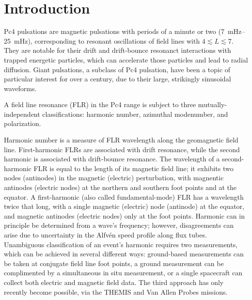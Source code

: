 \documentclass{article}
\newcommand{\Alfven}{Alfv\'en\xspace}
\begin{document}

\section{Introduction}

Pc4 pulsations are magnetic pulsations with periods of a minute or two (\SIrange{7}{25}{\mHz}), corresponding to resonant oscillations of field lines with $4 \lesssim L \lesssim 7$. They are notable for their drift and drift-bounce resonanct interactions with trapped energetic particles\cite{southwood_1976}, which can accelerate those particles\cite{elkington_1999} and lead to radial diffusion\cite{elkington_2003}. Giant pulsations, a subclass of Pc4 pulsation, have been a topic of particular interest for over a century, due to their large, strikingly sinusoidal waveforms\cite{brekke_1987}.

A field line resonance (FLR) in the Pc4 range is subject to three mutually-independent classifications: harmonic number, azimuthal modenumber, and polarization.

Harmonic number is a measure of FLR wavelength along the geomagnetic field line. First-harmonic FLRs are associated with drift resonance, while the second harmonic is associated with drift-bounce resonance\cite{dai_2013,poulter_1983}. The wavelength of a second-harmonic FLR is equal to the length of its magnetic field line; it exhibits two nodes (antinodes) in the magnetic (electric) perturbation, with magnentic antinodes (electric nodes) at the northern and southern foot points and at the equator. A first-harmonic (also called fundamental-mode) FLR has a wavelength twice that long, with a single magnetic (electric) node (antinode) at the equator, and magnetic antinodes (electric nodes) only at the foot points. Harmonic can in principle be determined from a wave's frequency; however, disagreements can arise due to uncertainty in the \Alfven speed profile along flux tubes\cite{takahashi_2013}. Unambiguous classification of an event's harmonic requires two measurements, which can be achieved in several different ways: ground-based measurements can be taken at conjugate field line foot points, a ground measurement can be complimented by a simultaneous in situ measurement, or a single spacecraft can collect both electric and magnetic field data\cite{dai_2015}. The third approach has only recently become possible, via the THEMIS\cite{angelopoulos_2008} and Van Allen Probes\cite{stratton_2012} missions.
\end{document}
